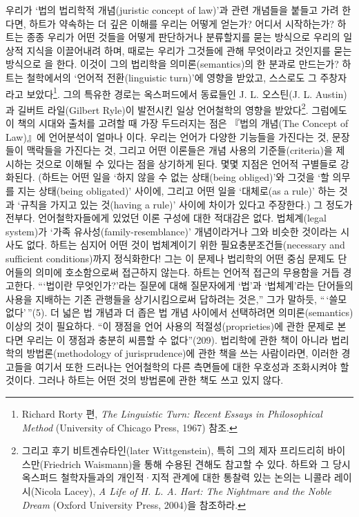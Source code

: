 우리가 ‘법의 법리학적 개념(juristic concept of law)’과 관련 개념들을
붙들고 가려 한다면, 하트가 약속하는 더 깊은 이해를 우리는 어떻게 얻는가?
어디서 시작하는가? 하트는 종종 우리가 어떤 것들을 어떻게 판단하거나
분류할지를 묻는 방식으로 우리의 일상적 지식을 이끌어내려 하며, 때로는
우리가 그것들에 관해 무엇이라고  것인지를 묻는 방식으로
을 한다. 이것이 그의 법리학을 의미론(semantics)의 한
분과로 만드는가? 하트는 철학에서의 ‘언어적 전환(linguistic turn)’에
영향을 받았고, 스스로도 그 주창자라고 보았다\footnote{Richard Rorty 편,
  \emph{The Linguistic Turn: Recent Essays in Philosophical Method}
  (University of Chicago Press, 1967) 참조.}. 그의 특유한 경로는
옥스퍼드에서 동료들인 J. L. 오스틴(J. L. Austin)과 길버트 라일(Gilbert
Ryle)이 발전시킨 일상 언어철학의 영향을 받았다\footnote{그리고 후기
  비트겐슈타인(later Wittgenstein), 특히 그의 제자 프리드리히
  바이스만(Friedrich Waismann)을 통해 수용된 견해도 참고할 수 있다.
  하트와 그 당시 옥스퍼드 철학자들과의 개인적·지적 관계에 대한 통찰력
  있는 논의는 니콜라 레이시(Nicola Lacey), \emph{A Life of H. L. A.
  Hart: The Nightmare and the Noble Dream} (Oxford University Press,
  2004)을 참조하라.}. 그럼에도 이 책의 시대와 출처를 고려할 때 가장
두드러지는 점은 『법의 개념(The Concept of Law)』에 언어분석이 얼마나
 이다. 우리는 언어가 다양한 기능들을 가진다는 것,
문장들이 맥락들을 가진다는 것, 그리고 어떤 이론들은 개념 사용의
기준들(criteria)을 제시하는 것으로 이해될 수 있다는 점을 상기하게 된다.
몇몇 지점은 언어적 구별들로 강화된다. (하트는 어떤 일을 ‘하지 않을 수
없는 상태(being obliged)’와 그것을 ‘할 의무를 지는 상태(being
obligated)’ 사이에, 그리고 어떤 일을 ‘대체로(as a rule)’ 하는 것과
‘규칙을 가지고 있는 것(having a rule)’ 사이에 차이가 있다고 주장한다.)
그 정도가 전부다. 언어철학자들에게 있었던 이론 구성에 대한 적대감은
없다. 법체계(legal system)가 ‘가족 유사성(family-resemblance)’
개념이라거나 그와 비슷한 것이라는 시사도 없다. 하트는 심지어 어떤 것이
법체계이기 위한 필요충분조건들(necessary and sufficient conditions)까지
정식화한다! 그는 이 문제나 법리학의 어떤 중심 문제도 단어들의 의미에
호소함으로써 접근하지 않는다. 하트는 언어적 접근의 무용함을 거듭
경고한다. “‘법이란 무엇인가?’라는 질문에 대해 질문자에게 ‘법’과
‘법체계’라는 단어들의 사용을 지배하는 기존 관행들을 상기시킴으로써
답하려는 것은,” 그가 말하듯, “\,‘쓸모없다’\,”(5). 더 넓은 법 개념과
더 좁은 법 개념 사이에서 선택하려면 의미론(semantics) 이상의 것이
필요하다. “이 쟁점을 언어 사용의 적절성(proprieties)에 관한 문제로
본다면 우리는 이 쟁점과 충분히 씨름할 수 없다”(209). 법리학에 관한 책이
아니라 법리학의 방법론(methodology of jurisprudence)에 관한 책을 쓰는
사람이라면, 이러한 경고들을 여기서 또한 드러나는 언어철학의 다른
측면들에 대한 우호성과 조화시켜야 할 것이다. 그러나 하트는 어떤 것의
방법론에 관한 책도 쓰고 있지 않다.

